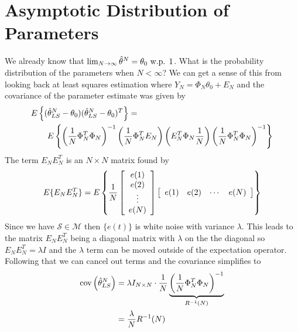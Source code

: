 \section{Asymptotic Distribution of Parameters}
We already know that $\lim_{N\to\infty}\hat{\theta}^N=\theta_0 \text{ w.p. } 1$. What is the probability distribution of the parameters when $N<\infty$? We can get a sense of this from looking back at least squares estimation where $Y_N=\Phi_N\theta_0+E_N$ and the covariance of the parameter estimate was given by
\begin{align*}
&E\left\lbrace (\hat{\theta}_{LS}^N-\theta_0)(\hat{\theta}_{LS}^N-\theta_0)^T\right\rbrace = \\
&\qquad E\left\lbrace \left(\frac{1}{N}\Phi_N^T\Phi_N\right)^{-1} \left(\frac{1}{N}\Phi_N^TE_N\right) \left(E_N^T\Phi_N\frac{1}{N}\right) \left(\frac{1}{N}\Phi_N^T\Phi_N\right)^{-1} \right\rbrace
\end{align*}
The term $E_NE_N^T$ is an $N\times N$ matrix found by
$$E\{E_NE_N^T\} = E\left\lbrace \frac{1}{N} \left[\begin{array}{c} e(1) \\ e(2) \\ \vdots \\ e(N) \end{array}\right] \left[\begin{array}{c c c c} e(1) & e(2) & \cdots & e(N) \end{array}\right]\right\rbrace$$
Since we have $\mathcal{S}\in\mathcal{M}$ then $\{e(t)\}$ is white noise with variance $\lambda$. This leads to the matrix $E_NE_N^T$ being a diagonal matrix with $\lambda$ on the the diagonal so $E_NE_N^T=\lambda I$ and the $\lambda$ term can be moved outside of the expectation operator. Following that we can cancel out terms and the covariance simplifies to
\begin{align*}
\text{cov}\left(\hat{\theta}_{LS}^N\right) &= \lambda I_{N\times N}\cdot \frac{1}{N}\underbrace{\left(\frac{1}{N}\Phi_N^T\Phi_N\right)^{-1}}_{R^{-1}(N)} \\
&= \frac{\lambda}{N}R^{-1}(N)
\end{align*}

